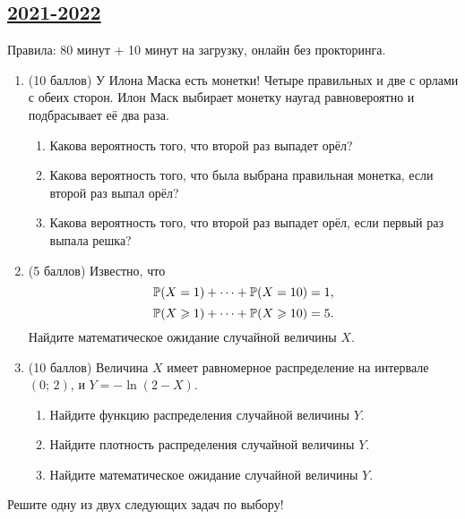   


\subsection[2021-2022]{\hyperref[sec:sol_kr_01_ip_2021_2022]{2021-2022}}
\label{sec:kr_01_ip_2021_2022}

Правила: 80 минут + 10 минут на загрузку, онлайн без прокторинга.

\begin{enumerate}
\item (10 баллов) У Илона Маска есть монетки! Четыре правильных и две с орлами с обеих сторон. Илон Маск выбирает монетку наугад равновероятно и подбрасывает её два раза.

\begin{enumerate}
\item Какова вероятность того, что второй раз выпадет орёл?
\item  Какова вероятность того, что была выбрана правильная монетка, если второй раз выпал орёл?
\item  Какова вероятность того, что второй раз выпадет орёл, если первый раз выпала решка?
\end{enumerate}

\item (5 баллов) Известно, что
\[
	\P(X = 1) + \cdots + \P(X = 10) = 1,
\]
\[
\P(X \geq 1) + \cdots + \P(X \geq 10) = 5.
\]
Найдите математическое ожидание случайной величины $X$.


\item (10 баллов) Величина $X$ имеет равномерное распределение на интервале $(0; \, 2)$, и $Y = - \ln (2 - X)$. 


\begin{enumerate}
	\item Найдите функцию распределения случайной величины $Y$.
	\item Найдите плотность распределения случайной величины $Y$.
	\item Найдите математическое ожидание случайной величины $Y$.
\end{enumerate}


\end{enumerate}

Решите одну из двух следующих задач по выбору!

